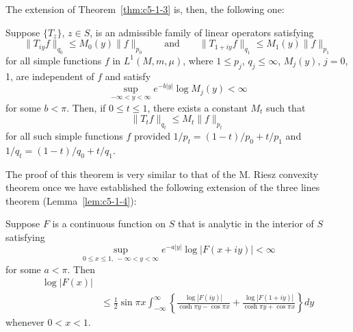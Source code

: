 The extension of Theorem~\ref{thm:c5-1-3} is, then, the following one:

\begin{theorem}\label{thm:c5-4-1}
Suppose $\{T_{z}\}$, $z \in S$, is an admissible family of linear operators
satisfying
\[
\|T_{iy}f\|_{q_{0}}\leq M_{0}(y)\|f\|_{p_{0}}
\qquad\text{and}\qquad
\|T_{1+iy}f\|_{q_{1}}\leq M_{1}(y)\|f\|_{p_{1}}
\]
for all simple functions $f$ in $L^{1}(M, m, \mu)$, where
$1 \leq p_{j}$, $q_{j} \leq \infty$, $M_{j}(y)$, $j = 0$, 1, are independent
of $f$ and satisfy
\[
\sup_{-\infty<y<\infty}e^{-b|y|}\log M_{j}(y)<\infty
\]
for some $b < \pi$. Then, if $0 \leq t \leq 1$, there exists a constant
$M_{t}$ such that
\[
\|T_{t}f\|_{q_{t}}\leq M_{t}\|f\|_{p_{t}}
\]
for all such simple functions $f$ provided
$1/p_{t} = (1 - t)/p_{0} + t/p_{1}$ and
$1/q_{t} = (1 - t)/q_{0} + t/q_{1}$.
\end{theorem}

The proof of this theorem is very similar to that of the M. Riesz convexity
theorem once we have established the following extension of the three lines
theorem (Lemma~\ref{lem:c5-1-4}):

\begin{lemma}\label{lem:c5-4-2}
Suppose $F$ is a continuous function on $S$ that is analytic in the interior
of $S$ satisfying
\begin{equation}\label{eq:c5-4-3}
\sup_{0 \leq x \leq 1,\ -\infty<y<\infty}e^{-a|y|}\log|F(x+iy)|<\infty
\end{equation}
for some $a < \pi$. Then
\begin{equation}\label{eq:c5-4-4}
\begin{aligned}
\log|F(x)|&\\
&\leq\tfrac{1}{2}\sin\pi x\int_{-\infty}^{\infty}
\left\{\frac{\log|F(iy)|}{\cosh\pi y-\cos\pi x}
+\frac{\log|F(1+iy)|}{\cosh\pi y+\cos\pi x}\right\}dy
\end{aligned}
\end{equation}
whenever $0 < x < 1$.
\end{lemma}

